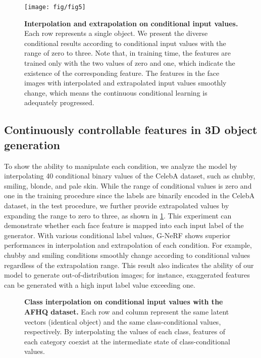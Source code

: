 \documentclass[nohyperref]{article}
\theoremstyle{plain}
\theoremstyle{definition}
\theoremstyle{remark}
\begin{document}
\begin{figure}[h]
\begin{center}
\centerline{\texttt{[image: fig/fig5]}}
\vskip -0.1in
\caption{\textbf{Interpolation and extrapolation on conditional input values.} Each row represents a single object. We present the diverse conditional results according to conditional input values with the range of zero to three. Note that, in training time, the features are trained only with the two values of zero and one, which indicate the existence of the corresponding feature. The features in the face images with interpolated and extrapolated input values smoothly change, which means the continuous conditional learning is adequately progressed.}
\label{figure_5}
\end{center}
\vskip -0.4in
\end{figure}


\subsection{Continuously controllable features in 3D object generation}
To show the ability to manipulate each condition, we analyze the model by interpolating 40 conditional binary values of the CelebA dataset, such as chubby, smiling, blonde, and pale skin. While the range of conditional values is zero and one in the training procedure since the labels are binarily encoded in the CelebA dataset, in the test procedure, we further provide extrapolated values by expanding the range to zero to three, as shown in \cref{figure_5}. This experiment can demonstrate whether each face feature is mapped into each input label of the generator. With various conditional label values, G-NeRF shows superior performances in interpolation \cite{davis1975interpolation} and extrapolation \cite{brezinski2013extrapolation} of each condition. For example, chubby and smiling conditions \cite{liu2015deep} smoothly change according to conditional values regardless of the extrapolation range. This result also indicates the ability of our model to generate out-of-distribution images; for instance, exaggerated features can be generated with a high input label value exceeding one. 


\begin{figure*}[h!]
\begin{center}
\vskip -0.15in
\caption{\textbf{Class interpolation on conditional input values with the AFHQ dataset.} Each row and column represent the same latent vectors (identical object) and the same class-conditional values, respectively. By interpolating the values of each class, features of each category coexist at the intermediate state of class-conditional values.}
\label{figure_6}
\end{center}
\vskip -0.2in
\end{figure*}
\end{document}
